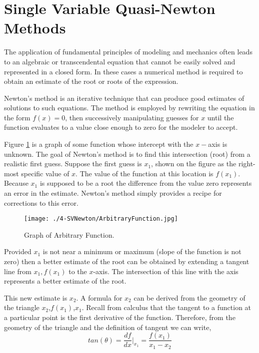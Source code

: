 \section{Single Variable Quasi-Newton Methods}

The application of fundamental principles of modeling and mechanics often leads to an algebraic or transcendental equation that cannot be easily solved and represented in a closed form.  
In these cases a numerical method is required to obtain an estimate of the root or roots of the expression.  

Newton's method is an iterative technique that can produce good estimates of solutions to such equations.  
The method is employed by rewriting the equation in the form $f(x)=0$, then successively manipulating guesses for $x$ until the function evaluates to a value close enough to zero for the modeler to accept.
  
Figure \ref{fig:ArbitraryFunction} is a graph of some function whose intercept with the $x-$axis is unknown.  
The goal of Newton's method is to find this intersection (root) from a realistic first guess.  
Suppose the first guess is $x_1$, shown on the figure as the right-most specific value of $x$. 
The value of the function at this location is $f(x_1)$.  
Because $x_1$ is supposed to be a root the difference from the value zero represents an error in the estimate.  
Newton's method simply provides a recipe for corrections to this error.  

\begin{figure}[h!] %
   \centering
   \texttt{[image: ./4-SVNewton/ArbitraryFunction.jpg]} 
   \caption{Graph of Arbitrary Function.}
   \label{fig:ArbitraryFunction}
\end{figure}

Provided $x_1$ is not near a minimum or maximum (slope of the function is not zero) then a better estimate of the root can be obtained by extending a tangent line from $x_1,f(x_1)$ to the $x$-axis.  
The intersection of this line with the axis represents a better estimate of the root.

This new estimate is $x_2$.  
A formula for $x_2$ can be derived from the geometry of the triangle $x_2$,$f(x_1)$,$x_1$.   
Recall from calculus that the tangent to a function at a particular point is the first derivative of the function.  
Therefore, from the geometry of the triangle and the definition of tangent we can write,
\begin{equation}
tan(\theta)=\frac{df}{dx}\Biggr\vert_{x_1} = \frac{f(x_1)}{x_1 - x_2}
\end{equation}

